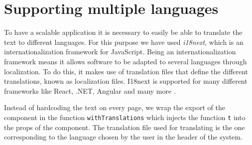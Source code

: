 \section{Supporting multiple languages}
To have a scalable application it is necessary to easily be able to translate the text to different languages.
For this purpose we have used \textit{i18next}, which is an internationalization framework for JavaScript.
Being an internationalization framework means it allows software to be adapted to several languages through localization.
To do this, it makes use of translation files that define the different translations, known as localization files.
I18next is supported for many different frameworks like React, .NET, Angular and many more \cite{i18next}.

Instead of hardcoding the text on every page, we wrap the export of the component in the function \texttt{withTranslations} which injects the function \texttt{t} into the props of the component.
The translation file used for translating is the one corresponding to the language chosen by the user in the header of the system.  

